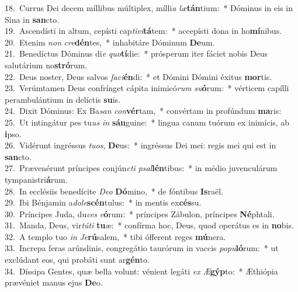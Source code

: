 {18.~}Currus Dei decem míllibus múltiplex, mílli\textit{a} \textit{læ}\textbf{tán}tium:~* Dóminus in eis in Sina in \textbf{san}cto.\\
{19.~}Ascendísti in altum, cepísti cap\textit{ti}\textit{vi}\textbf{tá}tem:~* accepísti dona in ho\textbf{mí}nibus.\\
{20.~}Etenim \textit{non} \textit{cre}\textbf{dén}tes,~* inhabitáre Dóminum \textbf{De}um.\\
{21.~}Benedíctus Dóminus di\textit{e} \textit{quo}\textbf{tí}die:~* prósperum iter fáciet nobis Deus salutárium no\textbf{stró}rum.\\
{22.~}Deus noster, Deus salvos \textit{fa}\textit{ci}\textbf{én}di:~* et Dómini Dómini éxitus \textbf{mor}tis.\\
{23.~}Verúmtamen Deus confrínget cápita inimicó\textit{rum} \textit{su}\textbf{ó}rum:~* vérticem capílli perambulántium in delíctis \textbf{su}is.\\
{24.~}Dixit Dóminus: Ex Ba\textit{san} \textit{con}\textbf{vér}tam,~* convértam in profúndum \textbf{ma}ris:\\
{25.~}Ut intingátur pes tu\textit{us} \textit{in} \textbf{sán}guine:~* lingua canum tuórum ex inimícis, ab \textbf{i}pso.\\
{26.~}Vidérunt ingréssus \textit{tu}\textit{os}, \textbf{De}us:~* ingréssus Dei mei: regis mei qui est in \textbf{san}cto.\\
{27.~}Prævenérunt príncipes conjún\textit{cti} \textit{psal}\textbf{lén}tibus:~* in médio juvenculárum tympanistri\textbf{á}rum.\\
{28.~}In ecclésiis benedícite \textit{De}\textit{o} \textbf{Dó}mino,~* de fóntibus \textbf{Is}raël.\\
{29.~}Ibi Bénjamin a\textit{do}\textit{le}\textbf{scén}tulus:~* in mentis ex\textbf{cés}su.\\
{30.~}Príncipes Juda, du\textit{ces} \textit{e}\textbf{ó}rum:~* príncipes Zábulon, príncipes \textbf{Né}phtali.\\
{31.~}Manda, Deus, vir\textit{tú}\textit{ti} \textbf{tu}æ:~* confírma hoc, Deus, quod operátus es in \textbf{no}bis.\\
{32.~}A templo tuo \textit{in} \textit{Je}\textbf{rú}salem,~* tibi ófferent reges \textbf{mú}nera.\\
{33.~}Increpa feras arúndinis, congregátio taurórum in vaccis \textit{po}\textit{pu}\textbf{ló}rum:~* ut exclúdant eos, qui probáti sunt ar\textbf{gén}to.\\
{34.~}Díssipa Gentes, quæ bella volunt: vénient legáti \textit{ex} \textit{Æ}\textbf{gýp}to:~* Æthiópia prævéniet manus ejus \textbf{De}o.\\
